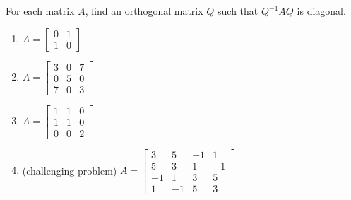 \documentclass{ximera}
\begin{document}
\begin{problem}\label{prob:findQ}
For each matrix $A$, find an orthogonal matrix $Q$ such that $Q^{-1}AQ$ is diagonal.

\begin{enumerate}
\item\label{prob:findQa} $A = \begin{bmatrix}
0 & 1 \\
1 & 0
\end{bmatrix}$

\item\label{prob:findQd} $A = \begin{bmatrix}
3 & 0 & 7 \\
0 & 5 & 0 \\
7 & 0 & 3
\end{bmatrix}$

\item\label{prob:findQe} $A = \begin{bmatrix}
1 & 1 & 0 \\
1 & 1 & 0 \\
0 & 0 & 2
\end{bmatrix}$

\item\label{prob:findQg} (challenging problem) $A = \begin{bmatrix}
3 & 5 & -1 & 1 \\
5 & 3 & 1 & -1 \\
-1 & 1 & 3 & 5 \\
1 & -1 & 5 & 3
\end{bmatrix}$
\end{enumerate}





\end{problem}
\end{document}
